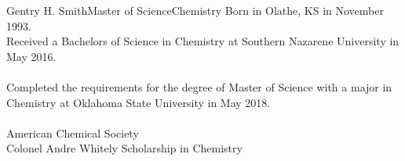 \newpage
\begin{vita}{Gentry H. Smith}{Master of Science}{Chemistry} %
     Born in Olathe, KS in November 1993.
     \\ Received a Bachelors of Science in Chemistry at Southern Nazarene University in May 2016. \\ \\
Completed the requirements for the degree of Master of Science with a major in Chemistry at Oklahoma State University in May 2018.
     \\ 
     \\ American Chemical Society
    \\ Colonel Andre Whitely Scholarship in Chemistry
\end{vita}
